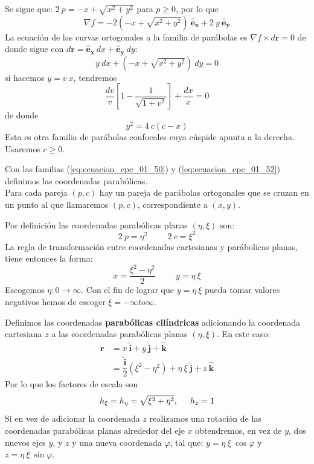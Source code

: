 Se sigue que: $2 \: p = -x + \sqrt{x^{2} + y^{2}}$ para $p \geq 0$, por lo que
\[  \nabla f =  -2 \left( -x + \sqrt{x^{2} + y^{2}} \right) \: \mathbf{\widehat{e}_{x}} + 2 \: y \: \mathbf{\widehat{e}_{y}} \]
La ecuación de las curvas ortogonales a la familia de parábolas es $\nabla f \times d \mathbf{r} = 0$ de donde sigue con $d \mathbf{r} = \mathbf{\widehat{e}_{x}} \: dx + \mathbf{\widehat{e}_{y}}\:  dy$:
\[ y \: dx +  \left( - x + \sqrt{x^{2} + y^{2}} \right) \: dy = 0 \]
si hacemos $y = v \: x$, tendremos
\[ \dfrac{dv}{v} \left[ 1 - \dfrac{1}{\sqrt{1 + v^{2}}} \right] + \dfrac{dx}{x} = 0 \]
de donde
\begin{equation}
 y^{2} = 4 \: c (c - x)
 \label{eq:ecuacion_cpc_01_52}
\end{equation}
Esta es otra familia de parábolas confocales cuya cúspide apunta a la derecha. Usaremos $c \geq 0$.
\par
Con las familias (\ref{eq:ecuacion_cpc_01_50}) y (\ref{eq:ecuacion_cpc_01_52}) definimos las coordenadas parabólicas.
\\
Para cada pareja $(p, c)$ hay un pareja de parábolas ortogonales que se cruzan en un punto al que llamaremos $(p, c)$, correspondiente a $(x, y)$.
\par
Por definición las coordenadas parabólicas planas $(\eta, \xi)$ son:
\[ 2 \: p = \eta^{2} \hspace{1cm} 2 \: c = \xi^{2} \]
La regla de transformación entre coordenadas cartesianas y parábolicas planas, tiene entonces la forma:
\[ x = \dfrac{\xi^{2} - \eta^{2}}{2} \hspace{1cm} y = \eta \: \xi \]
Escogemos $\eta:0 \to \infty$. Con el fin de lograr que $y = \eta \: \xi$ pueda tomar valores negativos hemos de escoger $\xi = -\infty to \infty$.
\par
Definimos las coordenadas \textbf{parabólicas cilíndricas} adicionando la coordenada cartesiana $z$ a las coordenadas parabólicas planas $(\eta, \xi)$. En este caso:
\begin{align*}
\mathbf{r} &= x \: \mathbf{\widehat{i}} + y \: \mathbf{\widehat{j}} + \mathbf{\widehat{k}} \\
&= \dfrac{\mathbf{\widehat{i}}}{2} \left( \xi^{2} - \eta^{2} \right) + \eta \: \xi \: \mathbf{\widehat{j}} + z \: \mathbf{\widehat{k}}
\end{align*}
Por lo que los factores de escala son
\[ h_{\xi} = h_{\eta} = \sqrt{\xi^{2} + \eta^{2}}, \hspace{0.5cm} h_{z} = 1  \]
Si en vez de adicionar la coordenada $z$ realizamos una rotación de las coordenadas parabólicas planas alrededor del eje $x$ obtendremos, en vez de $y$, dos nuevos ejes $y$, y $z$ y una nueva coordenada $\varphi$, tal que: $y = \eta \: \xi \: \cos \varphi$ y $z= \eta \: \xi \: \sin \varphi$.
